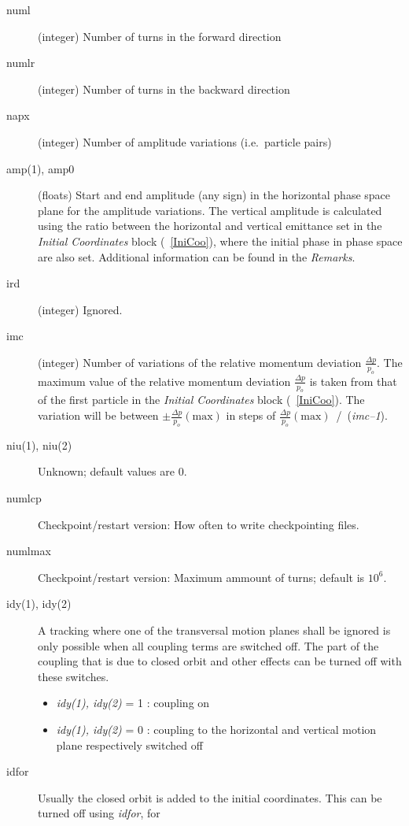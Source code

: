 \begin{description}
\item [numl] (integer) Number of turns in the forward direction
\item [numlr] (integer) Number of turns in the backward direction
\item [napx] (integer) Number of amplitude variations (i.e.\ particle pairs)
\item [amp(1), amp0] (floats) Start and end amplitude (any sign) in
  the horizontal phase space plane for the amplitude variations. The
  vertical amplitude is calculated using the ratio between the
  horizontal and vertical emittance set in the {\em Initial
    Coordinates} \/block (~\ref{IniCoo}), where the initial phase in
  phase space are also set. Additional information can be found in the
  {\em Remarks}\/.
\item [ird] (integer) Ignored.
\item [imc] (integer) Number of variations of the relative momentum
  deviation \mbox{$ \frac{\Delta p}{p_o} $}.  The maximum value of the
  relative momentum deviation \mbox{$ \frac{\Delta p}{p_o} $} is taken
  from that of the first particle in the {\em Initial Coordinates}
  \/block (~\ref{IniCoo}).  The variation will be between \mbox{$ \pm
    \frac{\Delta p}{p_o} (\mathrm{max}) $} in steps of \mbox{$
    \frac{\Delta p}{p_o} (\mathrm{max}) $ / ({\em imc--1}\/).}
\item[niu(1), niu(2)] Unknown; default values are 0.
\item[numlcp] Checkpoint/restart version: How often to write checkpointing files.
\item[numlmax] Checkpoint/restart version: Maximum ammount of turns; default is $10^6$.
\item [idy(1), idy(2)] A tracking where one of the transversal motion
  planes shall be ignored is only possible when all coupling terms are
  switched off.  The part of the coupling that is due to closed orbit
  and other effects can be turned off with these switches.
 \begin{itemize}
 \item {\em idy(1), idy(2)} \/= 1 : coupling on
 \item {\em idy(1), idy(2)} \/= 0 : coupling to the horizontal and
   vertical motion plane respectively switched off
 \end{itemize}
\item [idfor] Usually the closed orbit is added to the initial
  coordinates. This can be turned off using {\em idfor}\/, for

\end{description}
